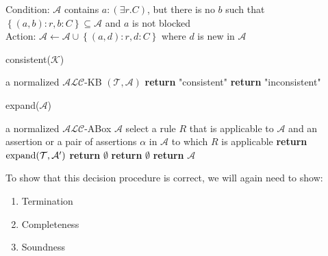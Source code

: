\begin{mdframed}[frametitle= The modified $\exists$-rule]
	Condition: $\mathcal{A}$ contains $a:(\exists r.C)$, but there is no $b$ such that \\$\left\{ (a,b) :r, b:C \right\} \subseteq \mathcal{A}$ and $a$ is not blocked \\
	Action: $\mathcal{A} \leftarrow \mathcal{A} \cup \left\{ (a,d):r, d:C \right\} $ where $d$ is new in $\mathcal{A}$
\end{mdframed}
\begin{definition}
	\begin{algorithm}[H]
		\caption{consistent($\mathcal{K}$)}
		\label{alg:kb consistent}
		\begin{algorithmic}[1]
			\Require a normalized $\mathcal{ALC}$-KB $(\mathcal{T},\mathcal{A})$
				\State \textbf{return} "consistent"
			\Else{}
				\State \textbf{return} "inconsistent"
			\EndIf
		\end{algorithmic}
	\end{algorithm}
	\begin{algorithm}[H]
		\caption{expand($\mathcal{A}$)}
		\label{alg:kb expand}
		\begin{algorithmic}[1]
			\Require a normalized $\mathcal{ALC}$-ABox $\mathcal{A}$ 
				\State select a rule $R$ that is applicable to $\mathcal{A}$ and an assertion or 
				\State a pair of assertions $\alpha$ in $\mathcal{A}$ to which $R$ is applicable
					\State \textbf{return} $\operatorname{\text{expand}}(\mathcal{T},\mathcal{A}')$
				\Else
						\State \textbf{return} $\emptyset$
				\EndIf
			\Else
					\State \textbf{return} $\emptyset$
				\Else
					\State \textbf{return} $\mathcal{A}$
				\EndIf
			\EndIf
		\end{algorithmic}
	\end{algorithm}
\end{definition}
To show that this decision procedure is correct, we will again need to show:
\begin{enumerate}
	\item Termination
	\item Completeness
	\item Soundness
\end{enumerate}


